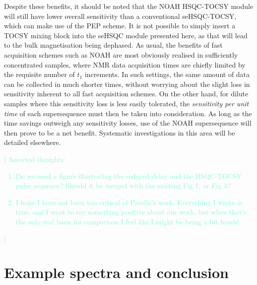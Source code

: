 \documentclass[11pt]{article}
\newcommand*{\hl}[1]{\textcolor{Aquamarine}{[#1]}}
\begin{document}
Despite these benefits, it should be noted that the NOAH HSQC-TOCSY module will still have lower overall sensitivity than a conventional seHSQC-TOCSY, which can make use of the PEP scheme.
It is not possible to simply insert a TOCSY mixing block into the seHSQC module presented here, as that will lead to the bulk magnetisation being dephased.
As usual, the benefits of fast acquisition schemes such as NOAH are most obviously realised in sufficiently concentrated samples, where NMR data acquisition times are chiefly limited by the requisite number of $t_1$ increments.
In such settings, the same amount of data can be collected in much shorter times, without worrying about the slight loss in sensitivity inherent to all fast acquisition schemes.
On the other hand, for dilute samples where this sensitivity loss is less easily tolerated, the \textit{sensitivity per unit time} of each supersequence must then be taken into consideration.
As long as the time savings outweigh any sensitivity losses, use of the NOAH supersequence will then prove to be a net benefit.
Systematic investigations in this area will be detailed elsewhere.

\hl{
    Assorted thoughts:
    \begin{enumerate}
        \item Do we need a figure illustrating the reduced delay and the HSQC-TOCSY pulse sequence? Should it be merged with the existing Fig 1, or Fig 4?
        \item I hope I have not been too critical of Parella's work. Everything I wrote \textit{is} true, and I want to say something positive about our work, but when that's the only real basis for comparison I feel like I might be being a bit harsh!
    \end{enumerate}
}

\section*{Example spectra and conclusion}
\end{document}
